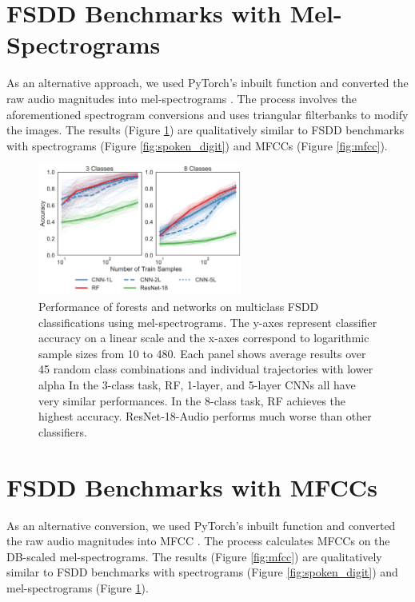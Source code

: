 \section{FSDD Benchmarks with Mel-Spectrograms}
\label{app:mel}
As an alternative approach, we used PyTorch’s inbuilt function and converted the raw audio magnitudes into mel-spectrograms \citep{pytorch}. The process involves the aforementioned spectrogram conversions and uses triangular filterbanks to modify the images. The results (Figure \ref{fig:mel}) are qualitatively similar to FSDD benchmarks with spectrograms (Figure \ref{fig:spoken_digit}) and MFCCs (Figure \ref{fig:mfcc}).

\begin{figure}[!htb]
\centering
\includegraphics[width=0.6\textwidth]{figures/mel.pdf}
  \caption{Performance of forests and networks on multiclass FSDD classifications using mel-spectrograms.
  The y-axes represent classifier accuracy on a linear scale and the x-axes correspond to logarithmic sample sizes from 10 to 480. Each panel shows average results over 45 random class combinations and individual trajectories with lower alpha
  In the 3-class task, RF, 1-layer, and 5-layer CNNs all have very similar performances. In the 8-class task, RF achieves the highest accuracy. ResNet-18-Audio performs much worse than other classifiers.
  }
\label{fig:mel}
\end{figure}
\clearpage

\section{FSDD Benchmarks with MFCCs}
\label{app:mfcc}
As an alternative conversion, we used PyTorch’s inbuilt function and converted the raw audio magnitudes into MFCC \citep{pytorch}. The process calculates MFCCs on the DB-scaled mel-spectrograms. The results (Figure \ref{fig:mfcc}) are qualitatively similar to FSDD benchmarks with spectrograms (Figure \ref{fig:spoken_digit}) and mel-spectrograms (Figure \ref{fig:mel}).

